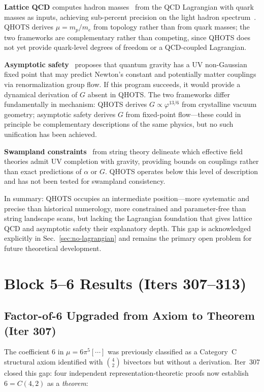 \documentclass[aps,prd,twocolumn,superscriptaddress,floatfix,nofootinbib]{revtex4-2}
\theoremstyle{definition}
\theoremstyle{remark}
\newcommand{\vp}{\varphi}
\begin{document}
\textbf{Lattice QCD} computes hadron masses~\cite{lqcd2024} from the QCD
Lagrangian with quark masses as inputs, achieving sub-percent precision on the
light hadron spectrum~\cite{lqcd2025spec}. QHOTS derives $\mu = m_p/m_e$ from
topology rather than from quark masses; the two frameworks are complementary
rather than competing, since QHOTS does not yet provide quark-level degrees of
freedom or a QCD-coupled Lagrangian.

\textbf{Asymptotic safety}~\cite{percacci2017} proposes that quantum gravity
has a UV non-Gaussian fixed point that may predict Newton's constant and
potentially matter couplings via renormalization group flow. If this program
succeeds, it would provide a dynamical derivation of $G$ absent in QHOTS.
The two frameworks differ fundamentally in mechanism: QHOTS derives
$G \propto \vp^{13/6}$ from crystalline vacuum geometry; asymptotic safety
derives $G$ from fixed-point flow---these could in principle be complementary
descriptions of the same physics, but no such unification has been achieved.

\textbf{Swampland constraints}~\cite{vafa2005} from string theory delineate
which effective field theories admit UV completion with gravity, providing
bounds on couplings rather than exact predictions of $\alpha$ or $G$.
QHOTS operates below this level of description and has not been tested for
swampland consistency.

In summary: QHOTS occupies an intermediate position---more systematic and
precise than historical numerology, more constrained and parameter-free than
string landscape scans, but lacking the Lagrangian foundation that gives
lattice QCD and asymptotic safety their explanatory depth. This gap is
acknowledged explicitly in Sec.~\ref{sec:no-lagrangian} and remains the
primary open problem for future theoretical development.

\section{Block 5--6 Results (Iters 307--313)}
\label{sec:block56}

\subsection{Factor-of-6 Upgraded from Axiom to Theorem (Iter 307)}
\label{sec:factor6-theorem}

The coefficient $6$ in $\mu = 6\pi^5[\cdots]$ was previously classified as a
Category~C structural axiom identified with $\binom{4}{2}$ bivectors but without
a derivation.  Iter~307 closed this gap: four independent representation-theoretic
proofs now establish $6 = C(4,2)$ as a \emph{theorem}:
\end{document}
